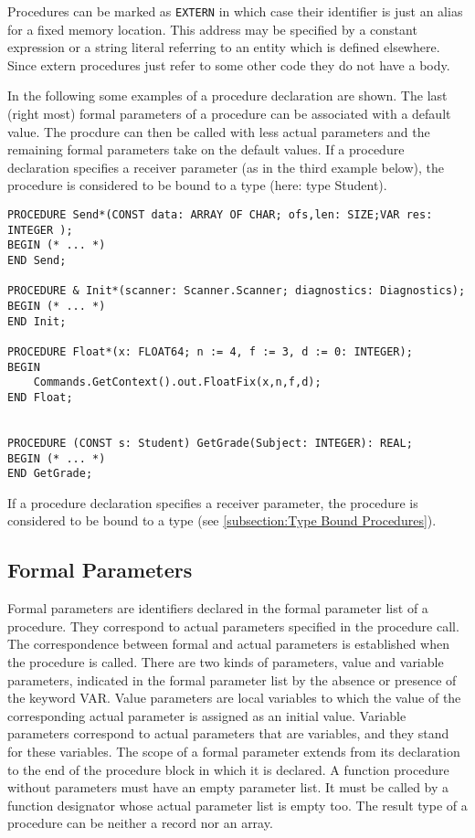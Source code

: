 \documentclass[a4wide,11pt]{article}
\begin{document}
Procedures can be marked as \lstinline"EXTERN" in which case their identifier is just an alias for a fixed memory location.
This address may be specified by a constant expression or a string literal referring to an entity which is defined elsewhere.
Since extern procedures just refer to some other code they do not have a body.

In the following some examples of a procedure declaration are shown.
The last (right most) formal parameters of a procedure can be associated with a default value.
The procdure can then be called with less actual parameters and the remaining formal parameters take on the default values.
If a procedure declaration specifies a receiver parameter (as in the third example below), the procedure is considered to be bound to a type (here: type Student).

\begin{annotation}
\begin{lstlisting}[style=example]
PROCEDURE Send*(CONST data: ARRAY OF CHAR; ofs,len: SIZE;VAR res: INTEGER );
BEGIN (* ... *)
END Send;

PROCEDURE & Init*(scanner: Scanner.Scanner; diagnostics: Diagnostics);
BEGIN (* ... *)
END Init;

PROCEDURE Float*(x: FLOAT64; n := 4, f := 3, d := 0: INTEGER);
BEGIN
	Commands.GetContext().out.FloatFix(x,n,f,d);
END Float;


PROCEDURE (CONST s: Student) GetGrade(Subject: INTEGER): REAL;
BEGIN (* ... *)
END GetGrade;
\end{lstlisting}
\end{annotation}

If a procedure declaration specifies a receiver parameter, the procedure is considered to be bound to a type (see \ref{subsection:Type Bound Procedures}).

\subsection{Formal Parameters}\label{subsection: Formal Parameters}
Formal parameters are identifiers declared in the formal parameter list of a procedure.
They correspond to actual parameters specified in the procedure call.
The correspondence between formal and actual parameters is established when the procedure is called.
There are two kinds of parameters, value and variable parameters, indicated in the formal parameter list by the absence or presence of the keyword VAR.
Value parameters are local variables to which the value of the corresponding actual parameter is assigned as an initial value.
Variable parameters correspond to actual parameters that are variables, and they stand for these variables.
The scope of a formal parameter extends from its declaration to the end of the procedure block in which it is declared.
A function procedure without parameters must have an empty parameter list.
It must be called by a function designator whose actual parameter list is empty too.
The result type of a procedure can be neither a record nor an array.
\end{document}
